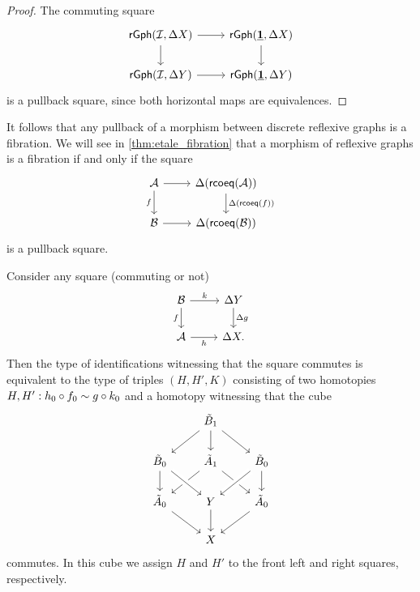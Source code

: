 \begin{proof}
The commuting square
\begin{equation*}
\begin{tikzcd}
\mathsf{rGph}(\mathcal{I},\Delta X) \arrow[d] \arrow[r] & \mathsf{rGph}(\unit,\Delta X) \arrow[d] \\
\mathsf{rGph}(\mathcal{I},\Delta Y) \arrow[r] & \mathsf{rGph}(\unit,\Delta Y)
\end{tikzcd}
\end{equation*}
is a pullback square, since both horizontal maps are equivalences.
\end{proof}

It follows that any pullback of a morphism between discrete reflexive graphs is a fibration. We will see in \cref{thm:etale_fibration} that a morphism of reflexive graphs is a fibration if and only if the square
\begin{equation*}
\begin{tikzcd}
\mathcal{A} \arrow[d,swap,"f"] \arrow[r] & \Delta(\rcoeq(\mathcal{A})) \arrow[d,"\Delta(\rcoeq(f))"] \\
\mathcal{B} \arrow[r] & \Delta(\rcoeq(\mathcal{B}))
\end{tikzcd}
\end{equation*}
is a pullback square.

\begin{lem}
Consider any square (commuting or not)
\begin{equation*}
\begin{tikzcd}
\mathcal{B} \arrow[d,swap,"f"] \arrow[r,"k"] & \Delta Y \arrow[d,"\Delta g"] \\
\mathcal{A} \arrow[r,swap,"h"] & \Delta X.
\end{tikzcd}
\end{equation*}
Then the type of identifications witnessing that the square commutes is equivalent to the type of triples $(H,H',K)$ consisting of two homotopies $H,H': h_0 \circ f_0\sim g\circ k_0$ and a homotopy witnessing that the cube
\begin{equation*}
\begin{tikzcd}
& \tilde{B}_1 \arrow[dl] \arrow[d] \arrow[dr] \\
\tilde{B}_0 \arrow[d] & \tilde{A}_1 \arrow[dl] \arrow[dr] & \tilde{B}_0 \arrow[dl,crossing over] \arrow[d] \\
\tilde{A}_0 \arrow[dr] & Y \arrow[from=ul,crossing over] \arrow[d] & \tilde{A}_0 \arrow[dl] \\
& X
\end{tikzcd}
\end{equation*}
commutes. In this cube we assign $H$ and $H'$ to the front left and right squares, respectively.
\end{lem}

